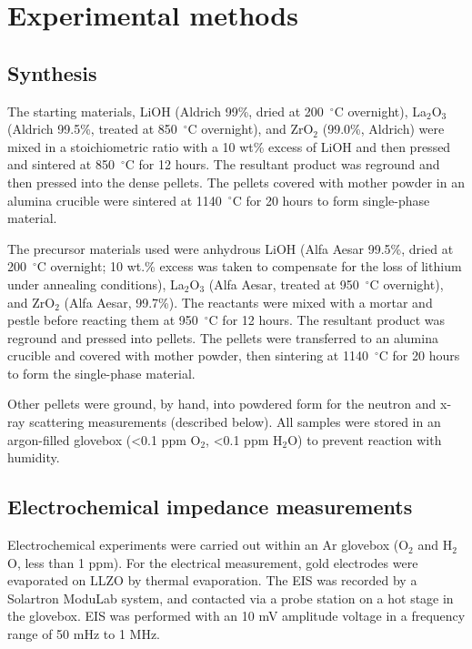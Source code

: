 \documentclass[twoside,twocolumn,9pt]{article}
\begin{document}
\section{Experimental methods}

\subsection{Synthesis}


The starting materials, LiOH (Aldrich 99\%, dried at 200~$^{\circ}$C overnight), La$_2$O$_3$ (Aldrich 99.5\%, treated at 850~$^{\circ}$C overnight), and ZrO$_2$ (99.0\%, Aldrich) were mixed in a stoichiometric ratio with a 10 wt\% excess of LiOH and then pressed and sintered at 850~$^{\circ}$C for 12 hours. The resultant product was reground and then pressed into the dense pellets. The pellets covered with mother powder in an alumina crucible were sintered at 1140~$^{\circ}$C for 20 hours to form single-phase material.


The precursor materials used were anhydrous LiOH (Alfa Aesar 99.5\%, dried at 200~$^{\circ}$C overnight; 10 wt.\% excess was taken to compensate for the loss of lithium under annealing conditions), La$_2$O$_3$ (Alfa Aesar, treated at 950~$^{\circ}$C overnight), and ZrO$_2$ (Alfa Aesar, 99.7\%). The reactants were mixed with a mortar and pestle before reacting them at 950~$^{\circ}$C for 12 hours. The resultant product was reground and pressed into pellets. The pellets were transferred to an alumina crucible and covered with mother powder, then sintering at 1140~$^{\circ}$C for 20 hours to form the single-phase material.

Other pellets were ground, by hand, into powdered form for the neutron and x-ray scattering measurements (described below). All samples were stored in an argon-filled glovebox (<0.1 ppm O$_2$, <0.1 ppm H$_2$O) to prevent reaction with humidity.

\subsection{Electrochemical impedance measurements}

Electrochemical experiments were carried out within an Ar glovebox (O$_2$ and H$_2$O, less than 1 ppm). For the electrical measurement,
gold electrodes were evaporated on LLZO by thermal evaporation. The EIS was recorded by a Solartron ModuLab system,
and contacted via a probe station on a hot stage in the glovebox. EIS was performed with an 10 mV amplitude voltage in a frequency range of 50 mHz to 1 MHz.
\end{document}
